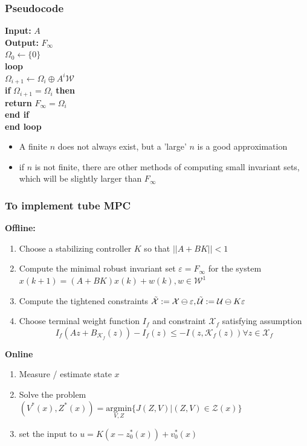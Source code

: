 \subsubsection{Pseudocode}
\begin{minipage}{0.4\linewidth}
\textbf{Input:} $A$ \\
\textbf{Output:} $ F_\infty $ \\
\hspace*{3mm} $\Omega_0 \leftarrow \{0\}$\\
\hspace*{3mm} \textbf{loop}\\
\hspace*{5mm} $\Omega_{i+1} \leftarrow \Omega_i \oplus A^i \mathcal{W}$\\
\hspace*{5mm} \textbf{if} $\Omega_{i+1} = \Omega_i$ \textbf{then}\\
\hspace*{8mm} \textbf{return} $F_\infty=\Omega_i$\\
\hspace*{5mm} \textbf{end if}\\
\hspace*{3mm} \textbf{end loop}
\end{minipage}
\begin{minipage}{0.5\linewidth}
\begin{itemize}
    \item A finite $n$ does not always exist, but a 'large' $n$ is a good approximation
    \item if $n$ is not finite, there are other methods of computing small invariant sets, which will be slightly larger than $F_\infty$
\end{itemize}
\end{minipage}
\subsubsection{To implement tube MPC}
\textbf{Offline:}
\begin{enumerate}
    \item Choose a stabilizing controller $K$ so that $||A+BK||<1$
    \item Compute the minimal robust invariant set $\varepsilon = F_\infty$ for the system $x(k+1) = (A+BK)x(k) + w(k), w \in\mathcal{W}^1$
    \item Compute the tightened constraints $\Tilde{\mathcal{X}}:=\mathcal{X} \ominus \varepsilon, \Tilde{\mathcal{U}}:= \mathcal{U} \ominus K\varepsilon$
    \item Choose terminal weight function $I_f$ and constraint $\mathcal{X}_f$ satisfying assumption \[I_f(Az+B_{\mathcal{K}_f}(z)) -I_f(z)  \leq -I(z,\mathcal{K}_f(z))\forall z \in \mathcal{X}_f\]
\end{enumerate}
\textbf{Online}
\begin{enumerate}
    \item Measure / estimate state $x$
    \item Solve the problem $(V^*(x),Z^*(x)) =\underset{V,Z}{\mathrm{argmin}}\{J(Z,V)|(Z,V)\in \mathcal{Z}(x)\}$
    \item set the input to $u=K(x-z_0^*(x))+v_0^*(x)$
\end{enumerate}
